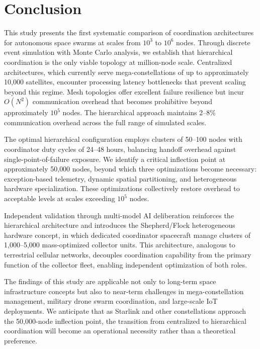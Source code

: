 \documentclass[journal]{IEEEtran}
\begin{document}
\section{Conclusion}

This study presents the first systematic comparison of coordination architectures for autonomous space swarms at scales from $10^3$ to $10^6$ nodes. Through discrete event simulation with Monte Carlo analysis, we establish that hierarchical coordination is the only viable topology at million-node scale. Centralized architectures, which currently serve mega-constellations of up to approximately 10{,}000 satellites, encounter processing latency bottlenecks that prevent scaling beyond this regime. Mesh topologies offer excellent failure resilience but incur $O(N^2)$ communication overhead that becomes prohibitive beyond approximately $10^5$ nodes. The hierarchical approach maintains 2--8\% communication overhead across the full range of simulated scales.

The optimal hierarchical configuration employs clusters of 50--100 nodes with coordinator duty cycles of 24--48 hours, balancing handoff overhead against single-point-of-failure exposure. We identify a critical inflection point at approximately 50{,}000 nodes, beyond which three optimizations become necessary: exception-based telemetry, dynamic spatial partitioning, and heterogeneous hardware specialization. These optimizations collectively restore overhead to acceptable levels at scales exceeding $10^5$ nodes.

Independent validation through multi-model AI deliberation reinforces the hierarchical architecture and introduces the Shepherd/Flock heterogeneous hardware concept, in which dedicated coordinator spacecraft manage clusters of 1{,}000--5{,}000 mass-optimized collector units. This architecture, analogous to terrestrial cellular networks, decouples coordination capability from the primary function of the collector fleet, enabling independent optimization of both roles.

The findings of this study are applicable not only to long-term space infrastructure concepts but also to near-term challenges in mega-constellation management, military drone swarm coordination, and large-scale IoT deployments. We anticipate that as Starlink and other constellations approach the 50{,}000-node inflection point, the transition from centralized to hierarchical coordination will become an operational necessity rather than a theoretical preference.
\end{document}
